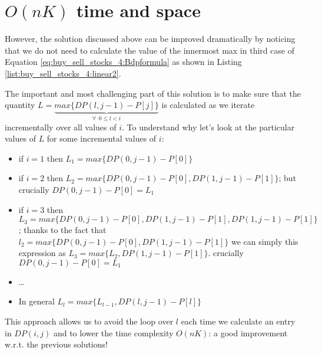 

\section{$O(nK)$ time and space}
\label{buy_sell_stocks4:sec:linerartime1}
However, the solution discussed above can be improved dramatically by noticing that we do not need to calculate the value of the innermost max in third case of Equation \ref{eq:buy_sell_stocks_4:Bdpformula} as shown in Listing \ref{list:buy_sell_stocks_4:linear2}.



The important and most challenging part of this solution is to make sure that the quantity $L=\underbrace{max\big\{DP(l,j-1)-P[j]\big\}}_{\forall \: \: 0 \leq l < i}$ is calculated as we iterate incrementally over all values of $i$. 
To understand why let's look at the particular values of $L$ for some incremental values of $i$:
\begin{itemize}
	\item if $i=1$ then $L_1=max\big\{DP(0,j-1)-P[0]\big\}$
	\item if $i=2$ then $L_2=max\big\{DP(0,j-1)-P[0],DP(1,j-1)-P[1]\big\}$; but crucially $DP(0,j-1)-P[0] = L_1$
	\item if $i=3$ then $L_3=max\big\{DP(0,j-1)-P[0],DP(1,j-1)-P[1],DP(1,j-1)-P[1]\big\}$; thanks to the fact that $l_2 = max \{DP(0,j-1)-P[0],DP(1,j-1)-P[1]\}$ we can simply this expression as  $L_3=max\big\{L_2,DP(1,j-1)-P[1]\big\}$.
	 crucially $DP(0,j-1)-P[0] = L_1$
	 \item \ldots
	 \item In general $L_l = max\big\{L_{l-1}, DP(l,j-1)-P[l]\big\}$
\end{itemize}

This approach allows us to avoid the loop over $l$ each time we calculate an entry in $DP(i,j)$ and to lower the time complexity $O(nK)$: a good improvement w.r.t. the previous solutions!


